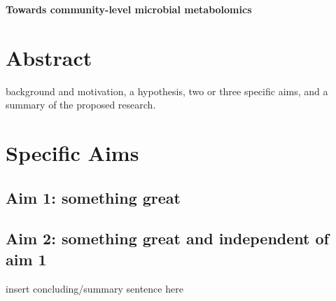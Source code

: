 \documentclass[12pt]{article}
\begin{document}
\sloppy
\begin{center}
    \textbf{Towards community-level microbial metabolomics}
\end{center}
\section*{Abstract}
background and motivation, a hypothesis, two or three specific aims, and a summary of the proposed research. \cite{bikel_combining_2015}

\section*{Specific Aims}

\subsection*{Aim 1: something great}

\subsection*{Aim 2: something great and independent of aim 1}

insert concluding/summary sentence here

\pagebreak

\section*{\refname}
\footnotesize{

\par}
\end{document}
